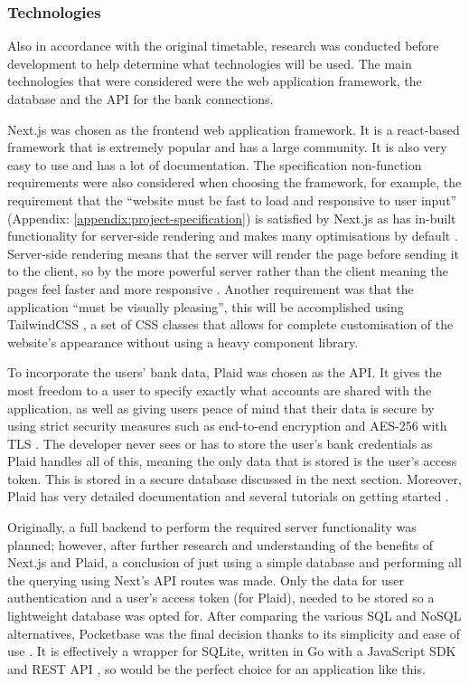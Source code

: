 \subsubsection{Technologies}
Also in accordance with the original timetable, research was conducted before development to help determine what technologies will be used. The main technologies that were considered were the web application framework, the database and the API for the bank connections.

Next.js was chosen as the frontend web application framework. It is a react-based framework that is extremely popular and has a large community. It is also very easy to use and has a lot of documentation. The specification non-function requirements were also considered when choosing the framework, for example, the requirement that the ``website must be fast to load and responsive to user input'' (Appendix: \ref{appendix:project-specification}) is satisfied by Next.js as has in-built functionality for server-side rendering and makes many optimisations by default \cite{NextjsPerformance}. Server-side rendering means that the server will render the page before sending it to the client, so by the more powerful server rather than the client meaning the pages feel faster and more responsive \cite{SSR}. Another requirement was that the application ``must be visually pleasing'', this will be accomplished using TailwindCSS \cite{TailwindCSS}, a set of CSS classes that allows for complete customisation of the website's appearance without using a heavy component library.

To incorporate the users' bank data, Plaid \cite{Plaid} was chosen as the API. It gives the most freedom to a user to specify exactly what accounts are shared with the application, as well as giving users peace of mind that their data is secure by using strict security measures such as end-to-end encryption and AES-256 with TLS \cite{Plaid}. The developer never sees or has to store the user's bank credentials as Plaid handles all of this, meaning the only data that is stored is the user's access token. This is stored in a secure database discussed in the next section. Moreover, Plaid has very detailed documentation and several tutorials on getting started \cite{PlaidGettingStarted}.

Originally, a full backend to perform the required server functionality was planned; however, after further research and understanding of the benefits of Next.js and Plaid, a conclusion of just using a simple database and performing all the querying using Next's API routes was made. Only the data for user authentication and a user's access token (for Plaid), needed to be stored so a lightweight database was opted for. After comparing the various SQL and NoSQL alternatives, Pocketbase was the final decision thanks to its simplicity and ease of use \cite{NoBackendsPocketbase}. It is effectively a wrapper for SQLite, written in Go with a JavaScript SDK and REST API \cite{PocketbaseJavaScriptSDK}, so would be the perfect choice for an application like this.


